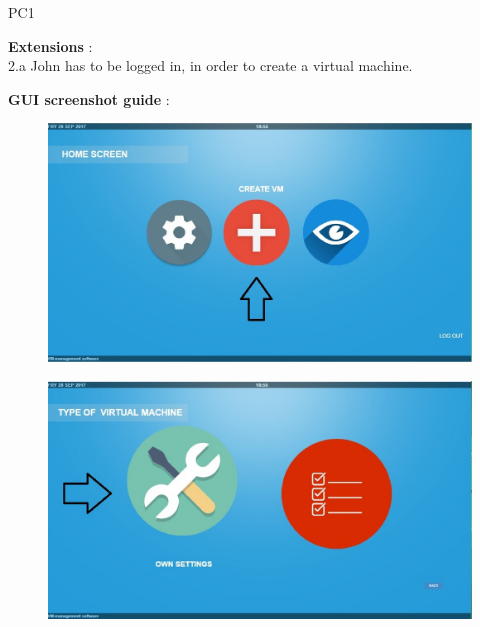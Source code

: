 \begin{lyxlist}{PC1}
{\item [\textbf{Extensions}]:\\
2.a John has to be logged in, in order to create a virtual machine.







\item [\textbf{GUI screenshot guide}]:\\

}

\begin{figure}[H]
\centering
\includegraphics[width=170mm]{images/createVMEx1.eps}
\caption{\label{overflow}}
\end{figure}

\begin{figure}[H]
\centering
\includegraphics[width=170mm]{images/createVMEx2.eps}
\caption{\label{overflow}}
\end{figure}


\end{lyxlist}
